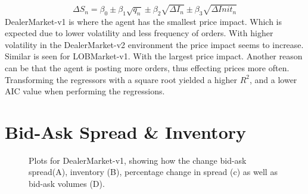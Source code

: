\documentclass{kththesis}
\theoremstyle{definition}
\begin{document}
\begin{equation}
    \Delta S_{n} = \beta_0 \pm \beta_1\sqrt{q_n} \pm \beta_2\sqrt{\Delta I_n} \pm \beta_3\sqrt{\Delta Init_{n}}
    \label{eq:regs}
\end{equation}
\newline
\newline
DealerMarket-v1 is where the agent has the smallest price impact. Which is expected due to lower volatility and less frequency of orders. With higher volatility in the DealerMarket-v2 environment the price impact seems to increase. Similar is seen for LOBMarket-v1. With the largest price impact. Another reason can be that the agent is posting more orders, thus effecting prices more often.  Transforming the regressors with a square root yielded a higher $R^{2}$, and a lower AIC value when performing the regressions.


\section{Bid-Ask Spread \& Inventory}
\begin{figure}
	    	\centering
		
		\caption{Plots for DealerMarket-v1, showing how the change bid-ask spread(A), inventory (B), percentage change in spread (c) as well as bid-ask volumes (D). }
		\label{fig:dm12}
\end{figure}
\end{document}
